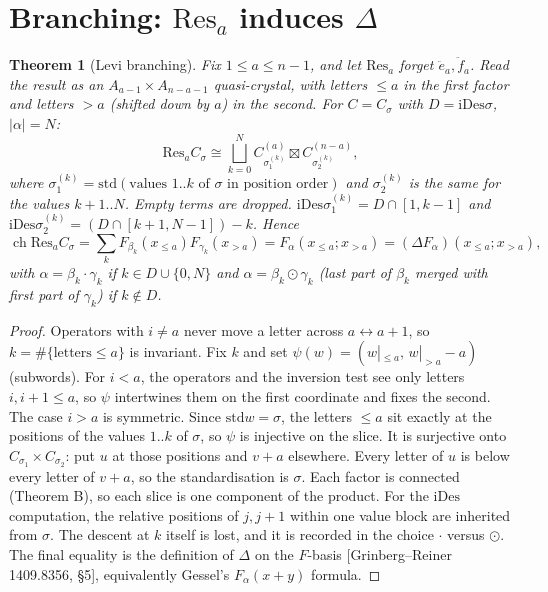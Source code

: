 \documentclass[11pt]{amsart}
\newtheorem{theorem}{Theorem}[section]
\theoremstyle{definition}
\theoremstyle{remark}
\newcommand{\ee}{\ddot e}
\newcommand{\ff}{\ddot f}
\newcommand{\std}{\mathrm{std}}
\newcommand{\iDes}{\mathrm{iDes}}
\newcommand{\Res}{\mathrm{Res}}
\begin{document}
\section{Branching: $\Res_a$ induces $\Delta$}

\begin{theorem}[Levi branching]\label{thm:C}
Fix $1\le a\le n-1$, and let $\Res_a$ forget $\ee_a,\ff_a$. Read the result as an $A_{a-1}\times A_{n-a-1}$ quasi-crystal, with letters $\le a$ in the first factor and letters $>a$ (shifted down by $a$) in the second. For $C=C_\sigma$ with $D=\iDes\sigma$, $|\alpha|=N$:
\[\Res_aC_\sigma\cong\bigsqcup_{k=0}^N C^{(a)}_{\sigma_1^{(k)}}\boxtimes C^{(n-a)}_{\sigma_2^{(k)}},\]
where $\sigma^{(k)}_1=\std(\text{values }1..k\text{ of }\sigma\text{ in position order})$ and $\sigma^{(k)}_2$ is the same for the values $k+1..N$. Empty terms are dropped. $\iDes\sigma_1^{(k)}=D\cap[1,k-1]$ and $\iDes\sigma_2^{(k)}=(D\cap[k+1,N-1])-k$. Hence
\[\operatorname{ch}\Res_aC_\sigma=\sum_kF_{\beta_k}(x_{\le a})F_{\gamma_k}(x_{>a})=F_\alpha(x_{\le a};x_{>a})=(\Delta F_\alpha)(x_{\le a};x_{>a}),\]
with $\alpha=\beta_k\cdot\gamma_k$ if $k\in D\cup\{0,N\}$ and $\alpha=\beta_k\odot\gamma_k$ (last part of $\beta_k$ merged with first part of $\gamma_k$) if $k\notin D$.
\end{theorem}
\begin{proof}
Operators with $i\ne a$ never move a letter across $a\leftrightarrow a+1$, so $k=\#\{\text{letters}\le a\}$ is invariant. Fix $k$ and set $\psi(w)=(w|_{\le a},\,w|_{>a}-a)$ (subwords). For $i<a$, the operators and the inversion test see only letters $i,i+1\le a$, so $\psi$ intertwines them on the first coordinate and fixes the second. The case $i>a$ is symmetric. Since $\std w=\sigma$, the letters $\le a$ sit exactly at the positions of the values $1..k$ of $\sigma$, so $\psi$ is injective on the slice. It is surjective onto $C_{\sigma_1}\times C_{\sigma_2}$: put $u$ at those positions and $v+a$ elsewhere. Every letter of $u$ is below every letter of $v+a$, so the standardisation is $\sigma$. Each factor is connected (Theorem B), so each slice is one component of the product. For the $\iDes$ computation, the relative positions of $j,j+1$ within one value block are inherited from $\sigma$. The descent at $k$ itself is lost, and it is recorded in the choice $\cdot$ versus $\odot$. The final equality is the definition of $\Delta$ on the $F$-basis [Grinberg--Reiner 1409.8356, \S5], equivalently Gessel's $F_\alpha(x+y)$ formula.
\end{proof}
\end{document}
